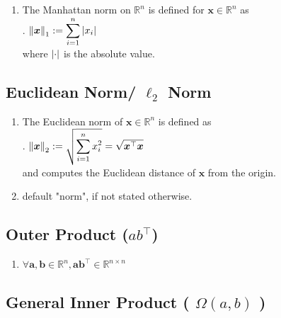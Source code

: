 \begin{enumerate}
    \item The Manhattan norm on $\mathbb{R}^n$ is defined for $\bm{x} \in \mathbb{R}^n$ as
    \hfill \cite{mfml/book/mml/Deisenroth-Faisal-Ong}
    \\
    .\hfill
    $
        \left\| \bm{x} \right\|_1 := \displaystyle\sum^n_{i=1} \left| x_i \right|
    $
    \hfill \cite{mfml/book/mml/Deisenroth-Faisal-Ong}
    \\
    where $\left| \cdot \right|$ is the absolute value.
    \hfill \cite{mfml/book/mml/Deisenroth-Faisal-Ong}
\end{enumerate}



\subsection{Euclidean Norm/ $\ell_2$ Norm}

\begin{enumerate}
    \item The Euclidean norm of $\bm{x} \in \mathbb{R}^n$ is defined as
    \hfill \cite{mfml/book/mml/Deisenroth-Faisal-Ong}
    \\
    .\hfill
    $
        \left\| \bm{x} \right\|_2 := \sqrt{ \displaystyle\sum^n_{i=1} x_i^2 } = \sqrt{\bm{x}^\top\bm{x}}
    $
    \hfill \cite{mfml/book/mml/Deisenroth-Faisal-Ong}
    \\
    and computes the Euclidean distance of $\bm{x}$ from the origin.
    \hfill \cite{mfml/book/mml/Deisenroth-Faisal-Ong}

    \item default "norm", if not stated otherwise.
    \hfill \cite{mfml/book/mml/Deisenroth-Faisal-Ong}
\end{enumerate}



\subsection{Outer Product ($ab^\top$) }

\begin{enumerate}
    \item $\forall \bm{a}, \bm{b} \in \mathbb{R}^n, \bm{ab}^\top \in \mathbb{R}^{n\times n}$
    \hfill \cite{mfml/book/mml/Deisenroth-Faisal-Ong}
    
\end{enumerate}



\subsection{General Inner Product ( $\Omega(a, b)$ )}

